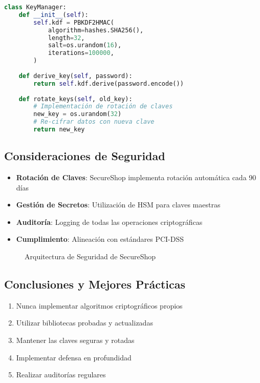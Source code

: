 \begin{lstlisting}[language=Python, caption=Gestión de Claves]
class KeyManager:
    def __init__(self):
        self.kdf = PBKDF2HMAC(
            algorithm=hashes.SHA256(),
            length=32,
            salt=os.urandom(16),
            iterations=100000,
        )
    
    def derive_key(self, password):
        return self.kdf.derive(password.encode())
    
    def rotate_keys(self, old_key):
        # Implementación de rotación de claves
        new_key = os.urandom(32)
        # Re-cifrar datos con nueva clave
        return new_key
\end{lstlisting}

\subsection{Consideraciones de Seguridad}
\begin{itemize}
    \item \textbf{Rotación de Claves}: SecureShop implementa rotación automática cada 90 días
    \item \textbf{Gestión de Secretos}: Utilización de HSM para claves maestras
    \item \textbf{Auditoría}: Logging de todas las operaciones criptográficas
    \item \textbf{Cumplimiento}: Alineación con estándares PCI-DSS
\end{itemize}

\begin{figure}[h]
\centering
\begin{tikzpicture}
\end{tikzpicture}
\caption{Arquitectura de Seguridad de SecureShop}
\end{figure}

\subsection{Conclusiones y Mejores Prácticas}
\begin{enumerate}
    \item Nunca implementar algoritmos criptográficos propios
    \item Utilizar bibliotecas probadas y actualizadas
    \item Mantener las claves seguras y rotadas
    \item Implementar defensa en profundidad
    \item Realizar auditorías regulares
\end{enumerate}

